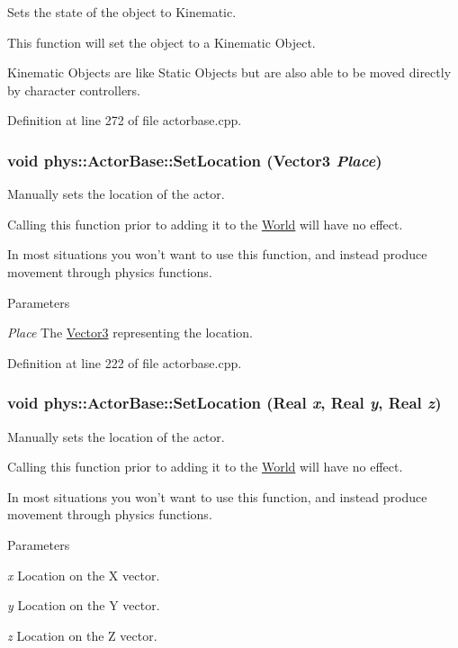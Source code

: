 Sets the state of the object to Kinematic. 

This function will set the object to a Kinematic Object. \par
 Kinematic Objects are like Static Objects but are also able to be moved directly by character controllers. 

Definition at line 272 of file actorbase.cpp.

\hypertarget{classphys_1_1ActorBase_a3212be459859a67bf7ae64919d58d5a5}{
\subsubsection[{SetLocation}]{\setlength{\rightskip}{0pt plus 5cm}void phys::ActorBase::SetLocation ({\bf Vector3} {\em Place})}}
\label{d8/d0f/classphys_1_1ActorBase_a3212be459859a67bf7ae64919d58d5a5}


Manually sets the location of the actor. 

Calling this function prior to adding it to the \hyperlink{classphys_1_1World}{World} will have no effect. \par
 In most situations you won't want to use this function, and instead produce movement through physics functions. 
\begin{DoxyParams}{Parameters}
\item[{\em Place}]The \hyperlink{classphys_1_1Vector3}{Vector3} representing the location. \end{DoxyParams}


Definition at line 222 of file actorbase.cpp.

\hypertarget{classphys_1_1ActorBase_a0b0db2ec0f4926326635b86f1ead2276}{
\subsubsection[{SetLocation}]{\setlength{\rightskip}{0pt plus 5cm}void phys::ActorBase::SetLocation ({\bf Real} {\em x}, \/  {\bf Real} {\em y}, \/  {\bf Real} {\em z})}}
\label{d8/d0f/classphys_1_1ActorBase_a0b0db2ec0f4926326635b86f1ead2276}


Manually sets the location of the actor. 

Calling this function prior to adding it to the \hyperlink{classphys_1_1World}{World} will have no effect. \par
 In most situations you won't want to use this function, and instead produce movement through physics functions. 
\begin{DoxyParams}{Parameters}
\item[{\em x}]Location on the X vector. \item[{\em y}]Location on the Y vector. \item[{\em z}]Location on the Z vector. \end{DoxyParams}


